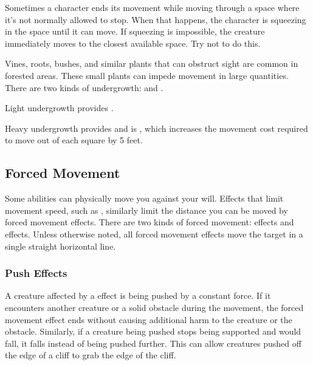      Sometimes a character ends its movement while moving through a space where it's not normally allowed to stop. When that happens, the character is squeezing in the space until it can move. If squeezing is impossible, the creature immediately moves to the closest available space. Try not to do this.

     Vines, roots, bushes, and similar plants that can obstruct sight are common in forested areas.
    These small plants can impede movement in large quantities.
    There are two kinds of undergrowth:  and .

    Light undergrowth provides .

    Heavy undergrowth provides  and is , which increases the movement cost required to move out of each square by 5 feet.

  \subsection{Forced Movement}\label{Forced Movement}
    Some abilities can physically move you against your will.
    Effects that limit movement speed, such as , similarly limit the distance you can be moved by forced movement effects.
    There are two kinds of forced movement:  effects and  effects.
    Unless otherwise noted, all forced movement effects move the target in a single straight horizontal line.

    \subsubsection{Push Effects}\label{Push Effects}
      A creature affected by a  effect is being pushed by a constant force.
      If it encounters another creature or a solid obstacle during the movement, the forced movement effect ends without causing additional harm to the creature or the obstacle.
      Similarly, if a creature being pushed stops being supported and would fall, it falls instead of being pushed further.
      This can allow creatures pushed off the edge of a cliff to grab the edge of the cliff.

